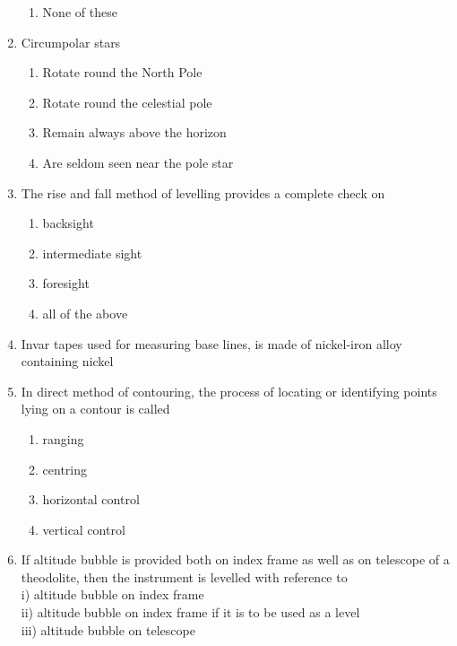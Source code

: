 \documentclass[11pt,a4paper]{article}
\begin{document}
\begin{enumerate}
\begin{enumerate}[label=\Alph*.]
\item{None of these}
\end{enumerate}
\item{Circumpolar stars}
\begin{enumerate}[label=\Alph*.]
\item{Rotate round the North Pole}
\item{Rotate round the celestial pole}
\item{Remain always above the horizon}
\item{Are seldom seen near the pole star}
\end{enumerate}
\item{The rise and fall method of levelling provides a complete check on}
\begin{enumerate}[label=\Alph*.]
\item{backsight}
\item{intermediate sight}
\item{foresight}
\item{all of the above}
\end{enumerate}
\item{Invar tapes used for measuring base lines, is made of nickel-iron alloy containing nickel}
\\
\item{In direct method of contouring, the process of locating or identifying points lying on a contour is called}
\begin{enumerate}[label=\Alph*.]
\item{ranging}
\item{centring}
\item{horizontal control}
\item{vertical control}
\end{enumerate}
\item{If altitude bubble is provided both on index frame as well as on telescope of a theodolite, then the instrument is levelled with reference to \\
i) altitude bubble on index frame \\
ii) altitude bubble on index frame if it is to be used as a level \\
iii) altitude bubble on telescope \\
}
\end{enumerate}
\end{document}
